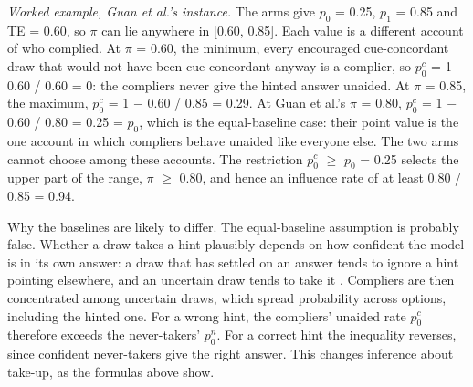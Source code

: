 \documentclass[11pt,a4paper]{article}
\begin{document}
\emph{Worked example, Guan et al.'s instance.} The arms give $p_0$ = 0.25, $p_1$ = 0.85 and TE = 0.60, so $\pi$ can lie anywhere in [0.60, 0.85]. Each value is a different account of who complied. At $\pi$ = 0.60, the minimum, every encouraged cue-concordant draw that would not have been cue-concordant anyway is a complier, so $p_0^{c}$ = 1 $-$ 0.60 / 0.60 = 0: the compliers never give the hinted answer unaided. At $\pi$ = 0.85, the maximum, $p_0^{c}$ = 1 $-$ 0.60 / 0.85 = 0.29. At Guan et al.'s $\pi$ = 0.80, $p_0^{c}$ = 1 $-$ 0.60 / 0.80 = 0.25 = $p_0$, which is the equal-baseline case: their point value is the one account in which compliers behave unaided like everyone else. The two arms cannot choose among these accounts. The restriction $p_0^{c}$ $\geq$ $p_0$ = 0.25 selects the upper part of the range, $\pi$ $\geq$ 0.80, and hence an influence rate of at least 0.80 / 0.85 = 0.94.

Why the baselines are likely to differ. The equal-baseline assumption is probably false. Whether a draw takes a hint plausibly depends on how confident the model is in its own answer: a draw that has settled on an answer tends to ignore a hint pointing elsewhere, and an uncertain draw tends to take it \citep{sharma2023towards,chen2025reasoning,lanham2023measuring}. Compliers are then concentrated among uncertain draws, which spread probability across options, including the hinted one. For a wrong hint, the compliers’ unaided rate $p_0^{c}$ therefore exceeds the never-takers’ $p_0^{n}$. For a correct hint the inequality reverses, since confident never-takers give the right answer. This changes inference about take-up, as the formulas above show.

\setcounter{subsection}{2}
\end{document}
